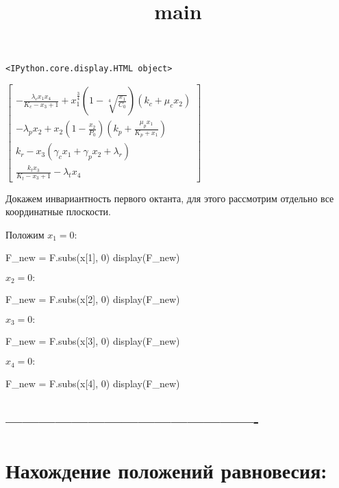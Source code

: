 \documentclass[11pt]{article}
\title{main}
\begin{document}
    
    \maketitle
    
    

    
    
    \begin{verbatim}
<IPython.core.display.HTML object>
    \end{verbatim}

    
    $\displaystyle \left[\begin{matrix}- \frac{\lambda_{c} x_{1} x_{4}}{K_{c} - x_{3} + 1} + x_{1}^{\frac{3}{4}} \left(1 - \sqrt[4]{\frac{x_{1}}{C_{0}}}\right) \left(k_{c} + \mu_{c} x_{2}\right)\\- \lambda_{p} x_{2} + x_{2} \left(1 - \frac{x_{2}}{P_{0}}\right) \left(k_{p} + \frac{\mu_{p} x_{1}}{K_{p} + x_{1}}\right)\\k_{r} - x_{3} \left(\gamma_{c} x_{1} + \gamma_{p} x_{2} + \lambda_{r}\right)\\\frac{k_{t} x_{3}}{K_{t} - x_{3} + 1} - \lambda_{t} x_{4}\end{matrix}\right]$

    
    Докажем инвариантность первого октанта, для этого рассмотрим отдельно
все координатные плоскости.

Положим \(x_1 = 0:\)

    F\_new = F.subs(x{[}1{]}, 0) display(F\_new)

    \(x_2 = 0:\)

    F\_new = F.subs(x{[}2{]}, 0) display(F\_new)

    \(x_3 = 0:\)

    F\_new = F.subs(x{[}3{]}, 0) display(F\_new)

    \(x_4 = 0:\)

    F\_new = F.subs(x{[}4{]}, 0) display(F\_new)

    \hypertarget{section}{%
\subsection{----------------------------------------------}\label{section}}

\hypertarget{ux43dux430ux445ux43eux436ux434ux435ux43dux438ux435-ux43fux43eux43bux43eux436ux435ux43dux438ux439-ux440ux430ux432ux43dux43eux432ux435ux441ux438ux44f}{%
\section{Нахождение положений
равновесия:}\label{ux43dux430ux445ux43eux436ux434ux435ux43dux438ux435-ux43fux43eux43bux43eux436ux435ux43dux438ux439-ux440ux430ux432ux43dux43eux432ux435ux441ux438ux44f}}
\end{document}
